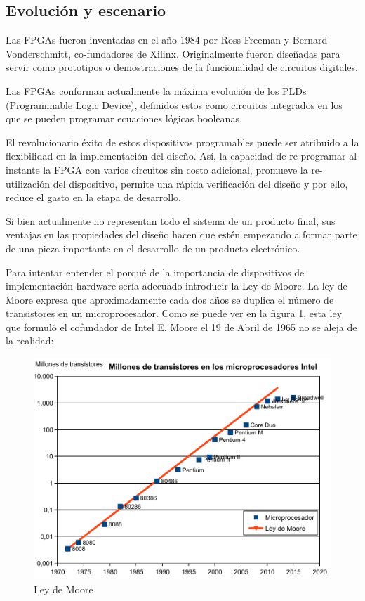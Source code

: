 \subsection{Evolución y escenario}

Las FPGAs fueron inventadas en el año 1984 por Ross Freeman y Bernard Vonderschmitt, co-fundadores de Xilinx.
Originalmente fueron diseñadas para servir como prototipos o demostraciones de la funcionalidad de circuitos digitales. \newline

Las FPGAs conforman actualmente la máxima evolución de los PLDs (Programmable Logic Device), definidos estos como circuitos integrados en los que se pueden programar ecuaciones lógicas booleanas. \newline

El revolucionario éxito de estos dispositivos programables puede ser atribuido a la flexibilidad en la implementación del diseño. Así, la capacidad de re-programar al instante la FPGA con varios circuitos sin costo adicional, promueve la re-utilización del dispositivo, permite una rápida verificación del diseño y por ello, reduce el gasto en la etapa de desarrollo. \newline

Si bien actualmente no representan todo el sistema de un producto final, sus ventajas en las propiedades del diseño hacen que estén empezando a formar parte de una pieza importante en el desarrollo de un producto electrónico. \newline

Para intentar entender el porqué de la importancia de dispositivos de implementación hardware sería adecuado introducir la Ley de Moore. \newline 
La ley de Moore expresa que aproximadamente cada dos años se duplica el número de transistores en un microprocesador. Como se puede ver en la figura \ref{fig:Ley_de_Moore}, esta ley que formuló el cofundador de Intel E. Moore el 19 de Abril de 1965 no se aleja de la realidad: 
\newline
\begin{figure}[H]
	\center
	\includegraphics[scale=0.7]{imagenes/EstadoArte/ley_moore-eps-converted-to.pdf}
	\caption{Ley de Moore}
	\label{fig:Ley_de_Moore}
\end{figure}
 

